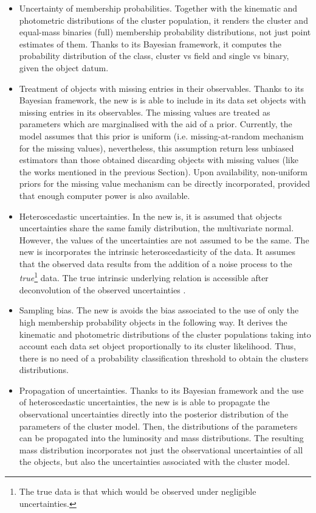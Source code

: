 \begin{itemize}
\item Uncertainty of membership probabilities. Together with the kinematic and photometric distributions of the cluster population, it renders the cluster and equal-mass binaries (full) membership probability distributions, not just point estimates of them. Thanks to its Bayesian framework, it computes the probability distribution of the class, cluster vs field and single vs binary, given the object datum. 

\item Treatment of objects with missing entries in their observables. Thanks to its Bayesian framework, the new \gls{is} is able to include in its data set objects with missing entries in its observables. The missing values are treated as parameters which are marginalised with the aid of a prior. Currently, the model assumes that this prior is uniform (i.e. missing-at-random mechanism for the missing values), nevertheless, this assumption return less unbiased estimators than those obtained discarding objects with missing values (like the works mentioned in the previous Section). Upon availability, non-uniform priors for the missing value mechanism can be directly incorporated, provided that enough computer power is also available.

\item Heteroscedastic uncertainties. In the new \gls{is}, it is assumed that objects uncertainties share the same family distribution, the multivariate normal. However, the values of the uncertainties are not assumed to be the same. The new \gls{is} incorporates the intrinsic heteroscedasticity of the data. It assumes that the observed data results from the addition of a noise process to the \emph{true}\footnote{The true data is that which would be observed under negligible uncertainties.} data. The true intrinsic underlying relation is accessible after deconvolution of the observed uncertainties \cite[see][for another example of deconvolution]{2009ApJ...700.1794B}.

\item Sampling bias. The new \gls{is} avoids the bias associated to the use of only the high membership probability objects in the following way. It derives the kinematic and photometric distributions of the cluster populations taking into account each data set object proportionally to its cluster likelihood. Thus, there is no need of a probability classification threshold to obtain the clusters distributions.

\item Propagation of uncertainties. Thanks to its Bayesian framework and the use of heteroscedastic uncertainties, the new \gls{is} is able to propagate the observational uncertainties directly into the posterior distribution of the parameters of the cluster model. Then, the distributions of the parameters can be propagated into the luminosity and mass distributions. The resulting mass distribution incorporates not just the observational uncertainties of all the objects, but also the uncertainties associated with the cluster model. 
\end{itemize}

